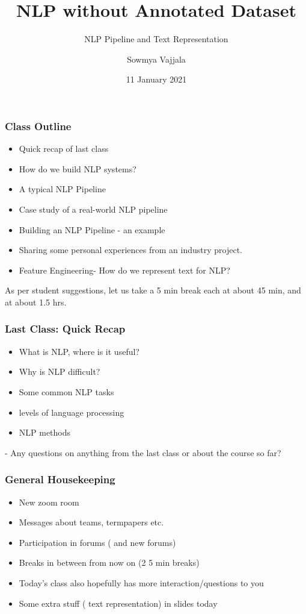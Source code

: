 \documentclass{beamer}
\author[Sowmya Vajjala]{Sowmya Vajjala}
\title[SfSNLP]{NLP without Annotated Dataset}
\subtitle{NLP Pipeline and Text Representation}
\date{11 January 2021}
\institute{Seminar f\"ur Sprachwissenschaft, University of T\"ubingen, Germany}
\begin{document}
\begin{frame}\titlepage
\end{frame}

\begin{frame}
\frametitle{Class Outline}
\begin{itemize}
    \item Quick recap of last class
    \item How do we build NLP systems?
    \item A typical NLP Pipeline
    \item Case study of a real-world NLP pipeline
    \item Building an NLP Pipeline - an example
    \item Sharing some personal experiences from an industry project.
    \item Feature Engineering- How do we represent text for NLP?
\end{itemize}
As per student suggestions, let us take a 5 min break each at about 45 min, and at about 1.5 hrs.
\end{frame}

\begin{frame}
\frametitle{Last Class: Quick Recap}
\begin{itemize}
    \item What is NLP, where is it useful?
    \item Why is NLP difficult?
    \item Some common NLP tasks
    \item levels of language processing
    \item NLP methods
\end{itemize}
- Any questions on anything from the last class or about the course so far?

\end{frame}

\begin{frame}
\frametitle{General Housekeeping}
\begin{itemize}
    \item New zoom room
    \item Messages about teams, termpapers etc.
    \item Participation in forums ( and new forums)
    \item Breaks in between from now on (2 5 min breaks)
    \item Today's class also hopefully has more interaction/questions to you
    \item Some extra stuff ( text representation) in slides today 
\end{itemize}
\end{frame}
\end{document}
